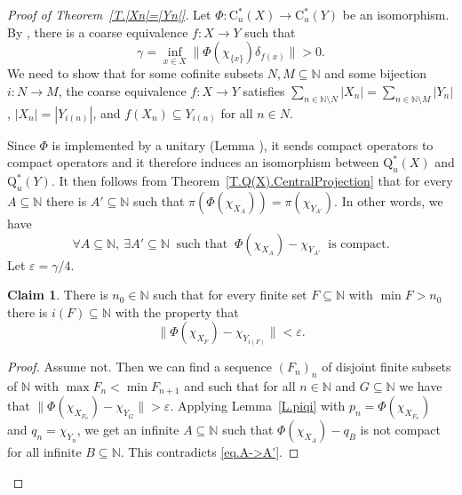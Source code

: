 \documentclass[11pt]{amsart}
\newcommand{\N}{\mathbb{N}}
\newcommand{\eps}{\varepsilon}
\newcommand{\cstu}{\mathrm{C}^*_u}
\newcommand{\roeq}{\mathrm{Q}^*_u}
\newcommand{\bbN}{\mathbb{N}}
\numberwithin{equation}{section}
\theoremstyle{definition}
\newtheorem{claim}[theorem]{Claim}
\theoremstyle{remark}
\numberwithin{equation}{section}
\begin{document}
\begin{proof}[Proof of Theorem~\ref{T.|Xn|=|Yn|}]
Let $\Phi\colon \cstu(X)\to \cstu(Y)$ be an isomorphism. By \cite[Theorem 1.2]{BaudierBragaFarahKhukhroVignatiWillett2021uRaRig}, there is a coarse equivalence $f\colon X\to Y$ such that 
\begin{equation}\label{EqCoarseEquivRig}
\gamma=\inf_{x\in X}\|\Phi(\chi_{\{x\}})\delta_{f(x)}\|>0.
\end{equation}
We need to show that for some cofinite subsets $N,M\subseteq\N$ and some bijection $i\colon N\to M$, the coarse equivalence $f\colon X\to Y$ satisfies 
$\sum_{n\in \N\setminus N}|X_n|=\sum_{n\in \N\setminus M}|Y_n|$, 
$|X_n|=|Y_{i(n)}|$,   and $f(X_n)\subseteq Y_{i(n)}$ for all $n\in N$.


Since $\Phi$ is implemented by a unitary (Lemma \cite[Lemma 3.1]{SpakulaWillett2013AdvMath}), it sends compact operators to compact operators  and it therefore  induces an isomorphism between $ \roeq(X)$ and $\roeq(Y)$. It then follows from Theorem~\ref{T.Q(X).CentralProjection} that for every $ A\subseteq \bbN$ there is $ A'\subseteq \bbN$ such that $\pi(\Phi(\chi_{X_A}))=\pi(\chi_{Y_{A'}})$. In other words, we have
		\begin{equation}\label{eq.A->A'}
 \forall A\subseteq \bbN,\ \exists A'\subseteq \bbN\ \text{ such that }\ 
		\Phi(\chi_{X_A})-\chi_{Y_{A'}}\ \text{ is compact}.
		\end{equation}
Let $\eps=\gamma/4$.

\begin{claim}
There is $n_0\in \N$ such that for every finite set $F\subseteq\bbN$ with $\min F>n_0$ there is  $i(F)\subseteq\bbN$ with the property that 
		\begin{equation}
		\label{eq.nn'}
		\|\Phi(\chi_{X_F}) -\chi_{Y_{i(F)}}\|<\varepsilon.
		\end{equation}
\end{claim}

\begin{proof}
Assume not. Then we can find a sequence $(F_n)_n$ of disjoint finite subsets  of $\N$  with $\max F_n<\min F_{n+1}$ and such that for all $n\in \N$ and $G\subseteq\bbN$ we have that $\|\Phi(\chi_{X_{F_n}})-\chi_{Y_G}\|>\varepsilon$. Applying Lemma~\ref{L.piqi} with $p_n=\Phi(\chi_{X_{F_n}})$ and $q_n=\chi_{Y_n}$, we get an infinite $A\subseteq\bbN$ such that $\Phi(\chi_{X_A})-q_B$ is not compact for all infinite $B\subseteq\bbN$. This contradicts \eqref{eq.A->A'}. 
\end{proof}


\end{proof}
\end{document}
